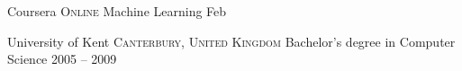 \documentclass[10pt,a4paper]{article}
\begin{document}
\spacedhrule{-0.2em}{-0.4em}


\headedsection
  {Coursera}
  {\textsc{Online}} {%
  \headedsubsection
    {Machine Learning}
    {Feb }
    {
  }
}

\headedsection
  {University of Kent}
  {\textsc{Canterbury, United Kingdom}} {%
  \headedsubsection
    {Bachelor's degree in Computer Science}
    {2005 -- 2009}
    {\bodytext{}
  }
}
\end{document}
